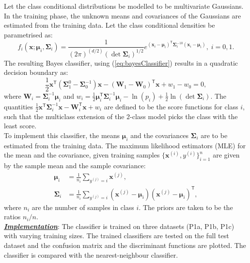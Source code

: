 \documentclass[12pt, a4 paper]{article}
\newcommand{\bx}{\mathbf{x}}
\newcommand{\bW}{\mathbf{W}}
\newcommand{\TT}{\mathsf{T}}
\newcommand{\bmu}{\boldsymbol{\mu}}
\newcommand{\bSigma}{\boldsymbol{\Sigma}}
\begin{document}
\label{prob:1.1}
Let the class conditional distributions be modelled to be multivariate Gaussians. In the training phase, the unknown means and covariances of the Gaussians are estimated from the training data. Let the class conditional densities be parametrised as:
\begin{equation}
	f_i(\bx; \bmu_i, \bSigma_i) = \frac{1}{(2\pi)^{(d/2)}(\det \bSigma_i)^{1/2}} e^{(\bx_i - \bmu_i)^\TT \bSigma_i^{-10} (\bx_i - \bmu_i)}, \; i=0,1.
\label{eq:mvGaussian}
\end{equation}
The resulting Bayes classifier, using (\ref{eq:bayesClassifier}) results in a quadratic decision boundary as:
\begin{equation}
	\frac{1}{2}\bx^\TT\left( \bSigma_1^{0} - \bSigma_{0}^{-1} \right)\bx - (\bW_{1} - \bW_{0})^{\TT}\bx + w_{1}-w_{0} = 0,
\label{eq:QDA}
\end{equation}
where $\bW_{i} = \bSigma_i^{-1}\bmu_i$ and $\displaystyle w_{i} = \frac{1}{2} \bmu_i^\TT \bSigma_i^{-1} \bmu_i - \ln \left( p_{i} \right) + \frac{1}{2}\ln \left( \det \bSigma_i \right)$. The quantities $\frac{1}{2}\bx^\TT \bSigma_i^{-1} \bx - \bW_{i}^{\TT}\bx + w_{i}$ are defined to be the score functions for class $i$, such that the multiclass extension of the $2$-class model picks the class with the least score. \\

To implement this classifier, the means $\bmu_{i}$ and the covariances $\bSigma_{i}$ are to be estimated from the training data. The maximum likelihood estimators (MLE) for the mean and the covariance, given training samples $\{\bx^{(i)}, y^{(i)}\}_{i=1}^n$ are given by the sample mean and the sample covariance:
\begin{equation}
\begin{split}
	\bmu_{i} &= \frac{1}{n_{i}} \sum_{y^{(j)} = i} \bx^{(j)}, \\
	\bSigma_{i} &= \frac{1}{n_{i}} \sum_{y^{(j)}=i} (\bx^{(j)} - \bmu_{i}) (\bx^{(j)} - \bmu_{i})^{\TT},
\end{split}
\label{eq:mleGaussian}
\end{equation}
where $n_{i}$ are the number of samples in class $i$. The priors are taken to be the ratios $n_{i}/n$. \\

\underline {\it \bfseries Implementation}: The classifier is trained on three datasets (P1a, P1b, P1c) with varying training sizes. The trained classifiers are tested on the full test dataset and the confusion matrix and the discriminant functions are plotted. The classifier is compared with the nearest-neighbour classifier. \\
\end{document}
